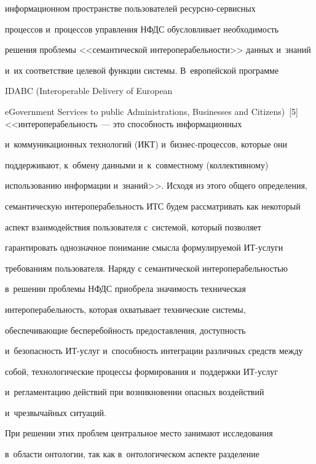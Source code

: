 информационном пространстве пользователей ре\-сурс\-но-сер\-вис\-ных


процессов и~процессов управ\-ле\-ния НФДС обусловливает необходимость


решения проблемы <<семантической интероперабельности>> данных и~знаний


и~их соответствие целевой функции системы. В~европейской программе


IDABC (Interoperable Delivery of European


eGovernment Services to public Administrations, Businesses and Citizens)~[5] <<интероперабельность~--- это способность информационных


и~коммуникационных технологий (ИКТ) и~биз\-нес-про\-цес\-сов, которые они


поддерживают, к~обмену данными и~к~совместному (коллективному)


использованию информации и~знаний>>. Исходя из этого общего определения,


семантическую интероперабельность ИТС будем рассматривать как некоторый


аспект взаимодействия пользователя с~системой, который позволяет


гарантировать однозначное понимание смысла формулируемой ИТ-услу\-ги


требованиям пользователя. Наряду с семантической интероперабельностью


в~решении проблемы НФДС приобрела значимость техническая


интероперабельность, которая охватывает технические системы,


обеспечивающие бесперебойность предоставления, доступность


и~безопасность ИТ-услуг и~способность интеграции различных средств между


собой, технологические процессы формирования и~поддержки ИТ-услуг


и~регламентацию действий при возникновении опасных воздействий


и~чрезвычайных ситуаций.











  При решении этих проблем центральное место занимают исследования


в~об\-ласти онтологии, так как в~онтологическом аспекте разделение


